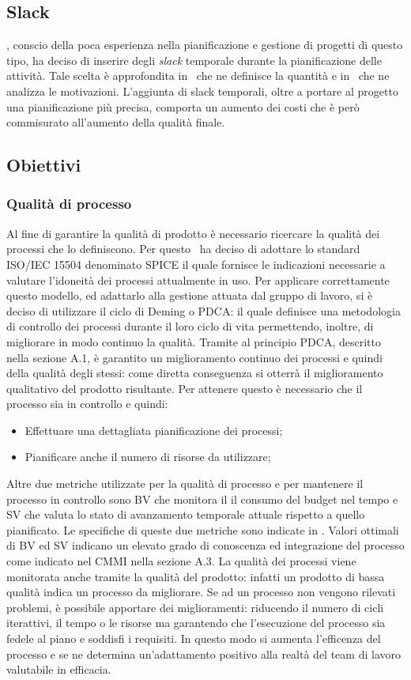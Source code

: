 \subsection{Slack}
\gruppo, conscio della poca esperienza nella pianificazione e gestione di progetti di questo tipo, ha deciso di inserire degli \textit{slack} temporale durante la pianificazione delle attività. Tale scelta è approfondita in \infoNDP ~che ne definisce la quantità e in \infoPDP ~che ne analizza le motivazioni.
L'aggiunta di slack temporali, oltre a portare al progetto una pianificazione più precisa, comporta un aumento dei costi che è però commisurato all'aumento della qualità finale.
\subsection{Obiettivi}
\subsubsection{Qualità di processo}
Al fine di garantire la qualità di prodotto è necessario ricercare la qualità dei processi che lo definiscono. Per questo \gruppo ~ha deciso di adottare lo standard ISO/IEC 15504 denominato SPICE il quale fornisce le indicazioni necessarie a valutare l'idoneità dei processi attualmente in uso.
Per applicare correttamente questo modello, ed adattarlo alla gestione attuata dal gruppo di lavoro, si è deciso di utilizzare il ciclo di Deming o PDCA: il quale definisce una metodologia di controllo dei processi durante il loro ciclo di vita permettendo, inoltre, di migliorare in modo continuo la qualità.
Tramite al principio PDCA, descritto nella sezione A.1, è garantito un miglioramento continuo dei processi e quindi della qualità degli stessi: come diretta conseguenza si otterrà il miglioramento qualitativo del prodotto risultante.
Per attenere questo è necessario che il processo sia in controllo e quindi:
\begin{itemize}
\item Effettuare una dettagliata pianificazione dei processi;
\item Pianificare anche il numero di risorse da utilizzare;
\end{itemize}
Altre due metriche utilizzate per la qualità di processo e per mantenere il processo in controllo sono BV che monitora il il consumo del budget nel tempo e SV che valuta lo stato di avanzamento temporale attuale rispetto a quello pianificato. Le specifiche di queste due metriche sono indicate in \infoNDP. Valori ottimali di BV ed SV indicano un elevato grado di conoscenza ed integrazione del processo come indicato nel CMMI nella sezione A.3.
La qualità dei processi viene monitorata anche tramite la qualità del prodotto: infatti un prodotto di bassa qualità indica un processo da migliorare. Se ad un processo non vengono rilevati problemi, è possibile apportare dei miglioramenti: riducendo il numero di cicli iterattivi, il tempo o le risorse ma garantendo che l'esecuzione del processo sia fedele al piano e soddisfi i requisiti. In questo modo si aumenta l'efficenza del processo e se ne determina un'adattamento positivo alla realtà del team di lavoro valutabile in efficacia.
